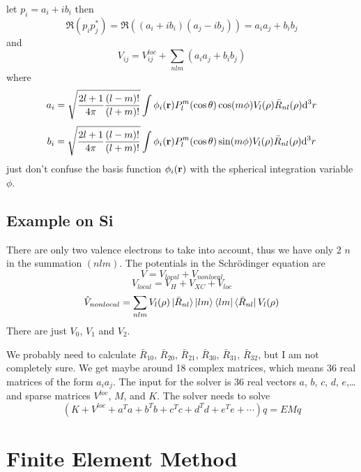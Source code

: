 let $p_i=a_i+ib_i$ then 
\begin{equation*}
  \Re(p_ip_j^*)=\Re((a_i+ib_i)(a_j-ib_j))=a_ia_j+b_ib_j
\end{equation*}
and 
\begin{equation*}
  V_{ij}=V_{ij}^{loc}+\sum_{nlm}(a_ia_j+b_ib_j)
\end{equation*}
where 
\begin{equation*}
  a_i= \sqrt{{2l+1\over4\pi}{(l-m)!\over(l+m)!}} \int \phi_i({\bf r})P_l^m(\cos\theta)\cos(m\phi)V_l(\rho)\bar R_{nl}(\rho){\rm d}^3 r
\end{equation*}
\begin{equation*}
  b_i= \sqrt{{2l+1\over4\pi}{(l-m)!\over(l+m)!}} \int \phi_i({\bf r})P_l^m(\cos\theta)\sin(m\phi)V_l(\rho)\bar R_{nl}(\rho){\rm d}^3 r
\end{equation*}
just don't confuse the basis function $\phi_i({\bf r})$ with the spherical integration variable $\phi$.

\subsection{Example on Si}

There are only two valence electrons to take into account, thus we have only 2 $n$ in the summation $(nlm)$. The potentials in the Schrödinger equation are 
\begin{equation*}
  V=V_{local}+V_{nonlocal}
\end{equation*}
\begin{equation*}
  V_{local}=V_H+V_{XC}+V_{loc}
\end{equation*}
\begin{equation*}
  \hat V_{nonlocal}= \sum_{nlm}V_l(\rho)\mathinner{|{\bar R_{nl}}\rangle}\mathinner{|{lm}\rangle} \mathinner{\langle{lm}|}\mathinner{\langle{\bar R_{nl}}|}V_l(\rho)
\end{equation*}
There are just $V_0$, $V_1$ and $V_2$.

We probably need to calculate $\bar R_{10}$, $\bar R_{20}$, $\bar R_{21}$, $\bar R_{30}$, $\bar R_{31}$, $\bar R_{32}$, but I am not completely sure. We get maybe around 18 complex matrices, which means 36 real matrices of the form $a_ia_j$. The input for the solver is 36 real vectors $a$, $b$, $c$, $d$, $e$,\dots and sparse matrices $V^{loc}$, $M$, and $K$. The solver needs to solve 
\begin{equation*}
  (K+V^{loc}+a^Ta+b^Tb+c^Tc+d^Td+e^Te+\cdots)q=EMq
\end{equation*}

\section{Finite Element Method}
